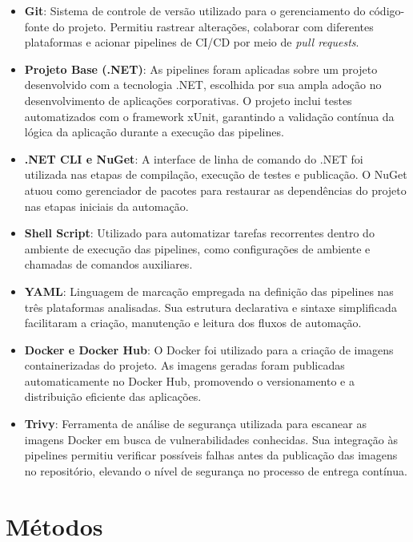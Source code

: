 \begin{itemize}
    \item \textbf{Git}: Sistema de controle de versão utilizado para o gerenciamento do código-fonte do projeto. Permitiu rastrear alterações, colaborar com diferentes plataformas e acionar pipelines de CI/CD por meio de \textit{pull requests}.

    \item \textbf{Projeto Base (.NET)}: As pipelines foram aplicadas sobre um projeto desenvolvido com a tecnologia .NET, escolhida por sua ampla adoção no desenvolvimento de aplicações corporativas. O projeto inclui testes automatizados com o framework xUnit, garantindo a validação contínua da lógica da aplicação durante a execução das pipelines.

    \item \textbf{.NET CLI e NuGet}: A interface de linha de comando do .NET foi utilizada nas etapas de compilação, execução de testes e publicação. O NuGet atuou como gerenciador de pacotes para restaurar as dependências do projeto nas etapas iniciais da automação.

    \item \textbf{Shell Script}: Utilizado para automatizar tarefas recorrentes dentro do ambiente de execução das pipelines, como configurações de ambiente e chamadas de comandos auxiliares.

    \item \textbf{YAML}: Linguagem de marcação empregada na definição das pipelines nas três plataformas analisadas. Sua estrutura declarativa e sintaxe simplificada facilitaram a criação, manutenção e leitura dos fluxos de automação.

    \item \textbf{Docker e Docker Hub}: O Docker foi utilizado para a criação de imagens containerizadas do projeto. As imagens geradas foram publicadas automaticamente no Docker Hub, promovendo o versionamento e a distribuição eficiente das aplicações.

    \item \textbf{Trivy}: Ferramenta de análise de segurança utilizada para escanear as imagens Docker em busca de vulnerabilidades conhecidas. Sua integração às pipelines permitiu verificar possíveis falhas antes da publicação das imagens no repositório, elevando o nível de segurança no processo de entrega contínua.
\end{itemize}

\chapter{Métodos}\label{cap:metodos}

